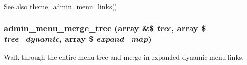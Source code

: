 \begin{DoxySeeAlso}{See also}
\hyperlink{admin__menu_8module_a33d1120bbd0ebf32f21f44c17b831475}{theme\_\-admin\_\-menu\_\-links()} 
\end{DoxySeeAlso}
\hypertarget{admin__menu_8inc_a575d57ae5a9c1a4b8729ef022e17e019}{
\subsubsection[{admin\_\-menu\_\-merge\_\-tree}]{\setlength{\rightskip}{0pt plus 5cm}admin\_\-menu\_\-merge\_\-tree (array \&\$ {\em tree}, \/  array \$ {\em tree\_\-dynamic}, \/  array \$ {\em expand\_\-map})}}
\label{admin__menu_8inc_a575d57ae5a9c1a4b8729ef022e17e019}
Walk through the entire menu tree and merge in expanded dynamic menu links.



